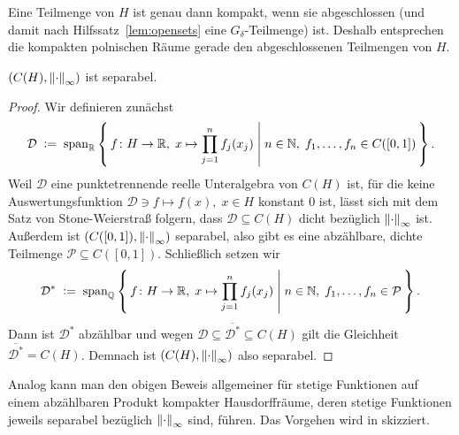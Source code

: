 \documentclass[../main/main.tex]{subfiles}
\begin{document}
	\begin{Bemerkung}
		Eine Teilmenge von $H$ ist genau dann kompakt, wenn sie 
		abgeschlossen (und damit nach Hilfssatz~\ref{lem:opensets} 
		eine $G_\delta$-Teilmenge) ist. Deshalb entsprechen die kompakten 
		polnischen Räume gerade den abgeschlossenen 
		Teilmengen von $H$.
	\end{Bemerkung}
	
	\begin{Hilfssatz}
		\label{lem:hilbertcubefunctionseparability}
		$(C(H), \left\lVert\cdot\right\rVert_\infty)$ ist separabel.
	\end{Hilfssatz}
	
	\begin{proof}
		Wir definieren zunächst 
		\[\mathcal{D} \; \vcentcolon = \; \mathrm{span}_{\mathbb{R}} 
		\left\{\, f \colon H \to \mathbb{R}, \; x
			 \mapsto \prod_{j=1}^{n} f_j(x_j)  \; \middle| \; n \in \mathbb{N}, \; f_1,
			\dots,f_n \in C([0, 1]) \,\right\} \text{.}\]
		Weil $\mathcal{D}$ eine punktetrennende reelle 
		Unteralgebra von $C(H)$ ist, für die keine 
		Auswertungsfunktion $\mathcal{D} \ni f \mapsto f(x), 
		\; x \in H$ konstant $0$ ist, lässt sich mit dem 
		Satz von Stone-Weierstraß folgern, dass $\mathcal{D} \subseteq C(H)$ 
		dicht bezüglich $\left\lVert\cdot\right\rVert_\infty$ ist.
		Außerdem ist $(C([0, 1]), \left\lVert\cdot\right\rVert_\infty)$ separabel, 
		also gibt es eine abzählbare, dichte Teilmenge 
		$\mathcal{P} \subseteq C([0, 1])$. Schließlich setzen wir
		\[\mathcal{D}^\ast \; \vcentcolon = \; \mathrm{span}_{\mathbb{Q}} 
		\left\{\, f \colon H \to \mathbb{R}, \; x \mapsto \prod_{j=1}^{n} f_j(x_j)  \; \middle| \; n \in \mathbb{N}, \; f_1,\dots,f_n \in \mathcal{P} \,\right\} \text{.}\]
		Dann ist $\mathcal{D}^\ast$ abzählbar und wegen 
		$ \mathcal{D} \subseteq \overline{\mathcal{D}^\ast} 
		\subseteq C(H)$ gilt die Gleichheit $\overline{\mathcal{D}^\ast} = C(H)$. 
		Demnach ist $(C(H), \left\lVert\cdot\right\rVert_\infty)$ also separabel.
	\end{proof}
	
	\begin{Bemerkung}
		Analog kann man den obigen Beweis allgemeiner für stetige Funktionen 
		auf einem abzählbaren Produkt kompakter Hausdorffräume, deren 
		stetige Funktionen jeweils separabel bezüglich $\left\lVert\cdot\right\rVert_\infty$ 
		sind, führen. Das Vorgehen wird in \cite[Lemma 4.12.1 und 
		Proposition 4.12.2]{Simon.2015} skizziert.
	\end{Bemerkung}
	
\end{document}
